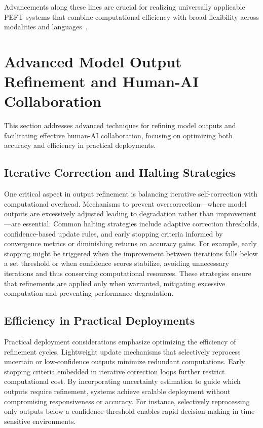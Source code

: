 \documentclass[sigconf]{acmart}
\begin{document}
Advancements along these lines are crucial for realizing universally applicable PEFT systems that combine computational efficiency with broad flexibility across modalities and languages~\cite{ref48}.

\section{Advanced Model Output Refinement and Human-AI Collaboration}

This section addresses advanced techniques for refining model outputs and facilitating effective human-AI collaboration, focusing on optimizing both accuracy and efficiency in practical deployments.

\subsection{Iterative Correction and Halting Strategies}
One critical aspect in output refinement is balancing iterative self-correction with computational overhead. Mechanisms to prevent overcorrection—where model outputs are excessively adjusted leading to degradation rather than improvement—are essential. Common halting strategies include adaptive correction thresholds, confidence-based update rules, and early stopping criteria informed by convergence metrics or diminishing returns on accuracy gains. For example, early stopping might be triggered when the improvement between iterations falls below a set threshold or when confidence scores stabilize, avoiding unnecessary iterations and thus conserving computational resources. These strategies ensure that refinements are applied only when warranted, mitigating excessive computation and preventing performance degradation.

\subsection{Efficiency in Practical Deployments}
Practical deployment considerations emphasize optimizing the efficiency of refinement cycles. Lightweight update mechanisms that selectively reprocess uncertain or low-confidence outputs minimize redundant computations. Early stopping criteria embedded in iterative correction loops further restrict computational cost. By incorporating uncertainty estimation to guide which outputs require refinement, systems achieve scalable deployment without compromising responsiveness or accuracy. For instance, selectively reprocessing only outputs below a confidence threshold enables rapid decision-making in time-sensitive environments.
\end{document}
